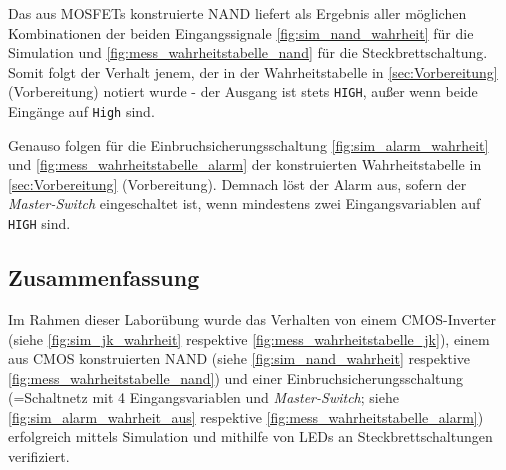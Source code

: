 \documentclass[12pt,english,ngerman]{scrartcl}
\begin{document}
Das aus MOSFETs konstruierte NAND liefert als Ergebnis aller möglichen
Kombinationen der beiden Eingangssignale \autoref{fig:sim_nand_wahrheit} für die Simulation
und \autoref{fig:mess_wahrheitstabelle_nand} für die Steckbrettschaltung.
Somit folgt der Verhalt jenem, der in der Wahrheitstabelle in \autoref{sec:Vorbereitung}
(Vorbereitung) notiert wurde - der Ausgang ist stets \texttt{HIGH}, außer wenn
beide Eingänge auf \texttt{High} sind.

Genauso folgen für die Einbruchsicherungsschaltung \autoref{fig:sim_alarm_wahrheit} 
und \autoref{fig:mess_wahrheitstabelle_alarm}
der konstruierten Wahrheitstabelle in \autoref{sec:Vorbereitung} (Vorbereitung).
Demnach löst der Alarm aus, sofern der \textit{Master-Switch} eingeschaltet ist, 
wenn mindestens
zwei Eingangsvariablen auf \texttt{HIGH} sind.


\subsection{Zusammenfassung}
Im Rahmen dieser Laborübung wurde das Verhalten von einem CMOS-Inverter (siehe \autoref{fig:sim_jk_wahrheit}
respektive \autoref{fig:mess_wahrheitstabelle_jk}), 
einem aus CMOS konstruierten NAND (siehe \autoref{fig:sim_nand_wahrheit}
respektive \autoref{fig:mess_wahrheitstabelle_nand}) und einer Einbruchsicherungsschaltung 
(=Schaltnetz mit 4 Eingangsvariablen
und \textit{Master-Switch}; siehe \autoref{fig:sim_alarm_wahrheit_aus}
respektive \autoref{fig:mess_wahrheitstabelle_alarm}) erfolgreich mittels 
Simulation und mithilfe von LEDs an Steckbrettschaltungen
verifiziert.
\newpage

\printbibliography

\listoffigures

\listoftables
\end{document}
